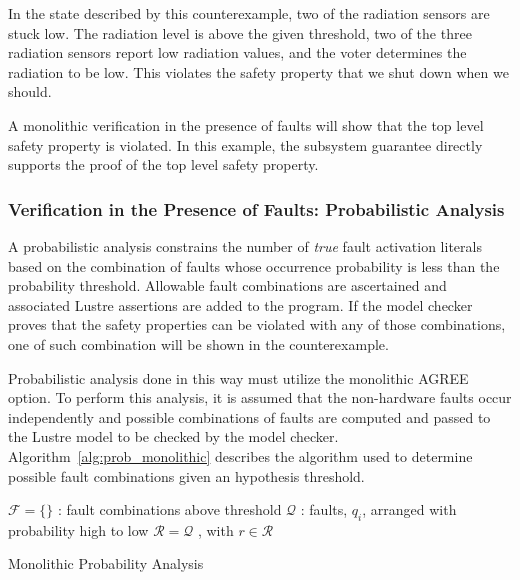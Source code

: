 In the state described by this counterexample, two of the radiation sensors are stuck low. The radiation level is above the given threshold, two of the three radiation sensors report low radiation values, and the voter determines the radiation to be low. This violates the safety property that we shut down when we should. 

A monolithic verification in the presence of faults will show that the top level safety property is violated. In this example, the subsystem guarantee directly supports the proof of the top level safety property. 

\subsubsection{Verification in the Presence of Faults: Probabilistic Analysis} 
A probabilistic analysis constrains the number of {\em true} fault activation literals based on the combination of faults whose occurrence probability is less than the probability threshold. Allowable fault combinations are ascertained and associated Lustre assertions are added to the program. If the model checker proves that the safety properties can be violated with any of those combinations, one of such combination will be shown in the counterexample. 

Probabilistic analysis done in this way must utilize the monolithic AGREE option. To perform this analysis, it is assumed that the non-hardware faults occur independently and possible combinations of faults are computed and passed to the Lustre model to be checked by the model checker. Algorithm~\ref{alg:prob_monolithic} describes the algorithm used to determine possible fault combinations given an hypothesis threshold.

\begin{algorithm}[H]
	$\mathcal{F} = \{\}$ : fault combinations above threshold \;
	$\mathcal{Q}$ : faults, $q_i$, arranged with probability high to low \;
	$\mathcal{R} = \mathcal{Q}$ , with $r \in \mathcal{R}$\;
	\caption{Monolithic Probability Analysis}
	\label{alg:prob_monolithic}
\end{algorithm}

